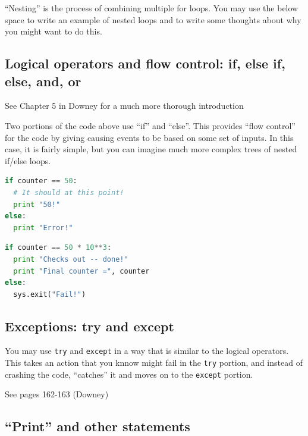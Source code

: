 \documentclass[a4paper,10pt]{scrartcl}
\begin{document}
``Nesting'' is the process of combining multiple for loops. You may use the below space to write an example of nested loops and to write some thoughts about why you might want to do this.

\vspace{6cm}

\subsection{Logical operators and flow control: if, else if, else, and, or}

\begin{framed}
 See Chapter 5 in Downey for a much more thorough introduction
\end{framed}

Two portions of the code above use ``if'' and ``else''. This provides ``flow control'' for the code by giving causing events to be based on some set of inputs. In this case, it is fairly simple, but you can imagine much more complex trees of nested if/else loops.

\begin{lstlisting}[belowskip=-1.6\baselineskip, language=python]
if counter == 50:
  # It should at this point!
  print "50!"
else:
  print "Error!"
\end{lstlisting}
  
\begin{lstlisting}[belowskip=-1.6\baselineskip, language=python]
if counter == 50 * 10**3:
  print "Checks out -- done!"
  print "Final counter =", counter
else:
  sys.exit("Fail!")
\end{lstlisting}

\subsection{Exceptions: try and except}

You may use \lstinline{try} and \lstinline{except} in a way that is similar to the logical operators. This takes an action that you knnow might fail in the \lstinline{try} portion, and instead of crashing the code, ``catches'' it and moves on to the \lstinline{except} portion.

\begin{framed}
 See pages 162-163 (Downey)
\end{framed}

\subsection{``Print'' and other statements}
\end{document}
